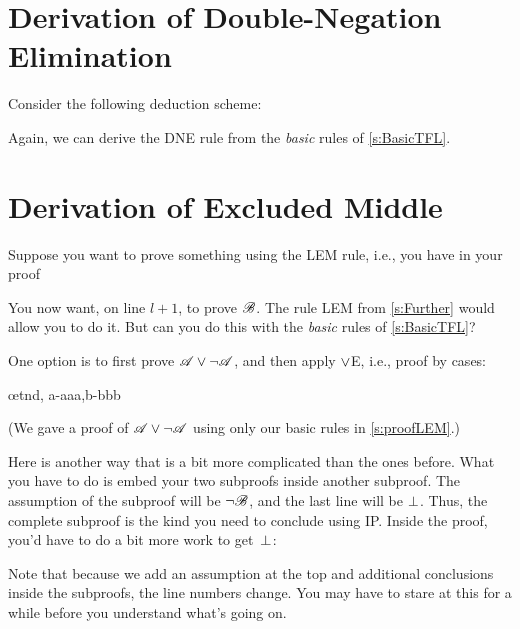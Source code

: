 \section{Derivation of Double-Negation Elimination}
Consider the following deduction scheme:
	\begin{fitchproof}
	\open
		\AS
	\close
\end{fitchproof}
Again,  we can derive the DNE rule from the \emph{basic} rules of \cref{s:BasicTFL}.

\section{Derivation of Excluded Middle}
Suppose you want to prove something using the LEM rule, i.e., you have in your proof
\begin{fitchproof}
  \open
  \AS
  \close
  \open
  \AS
  \close
\end{fitchproof}
You now want, on line $l+1$, to prove $\mathscr{B}$. The rule LEM from
\cref{s:Further} would allow you to do it. But can you do this with
the \emph{basic} rules of \cref{s:BasicTFL}?

One option is to first prove $\mathscr{A} \vee \neg\mathscr{A}$, and then apply $\vee$E, i.e., proof by cases:
\begin{fitchproof}
  \open
  \AS
  \close
  \open
  \AS
  \close
  \ellipsesline
  \oe{tnd, a-aaa,b-bbb}
\end{fitchproof}
(We gave a proof of $\mathscr{A} \vee \neg\mathscr{A}$ using only our basic rules in \cref{s:proofLEM}.)

Here is another way that is a bit more complicated than the ones before. What you have to do is embed your two subproofs inside another subproof. The assumption of the subproof will be $\neg \mathscr{B}$, and the last line will be $\bot$. Thus, the complete subproof is the kind you need to conclude  using IP. Inside the proof, you'd have to do a bit more work to get~$\bot$:
\begin{fitchproof}
  \open
  \AS
  \open
  \AS
  \ellipsesline
  \close
  \open
  \AS
  \ellipsesline
  \close
  \close
\end{fitchproof}
Note that because we add an assumption at the top and additional conclusions inside the subproofs, the line numbers change. You may have to stare at this for a while before you understand what's going on.


